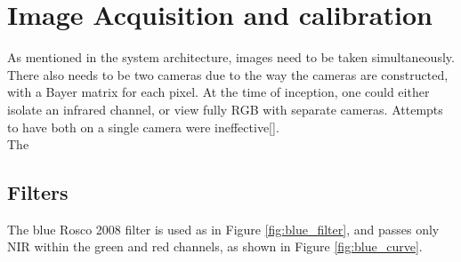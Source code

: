 \chapter{Image Acquisition and calibration}

As mentioned in the system architecture, images need to be taken simultaneously. There also needs to be two cameras due to the way the cameras are constructed, with a Bayer matrix for each pixel. At the time of inception, one could either isolate an infrared channel, or view fully RGB with separate cameras. Attempts to have both on a single camera were ineffective[].\\

\noindent
The

\section{Filters}

The blue Rosco 2008 filter is used as in Figure \ref{fig:blue_filter}, and passes only NIR within the green and red channels, as shown in Figure \ref{fig:blue_curve}.

